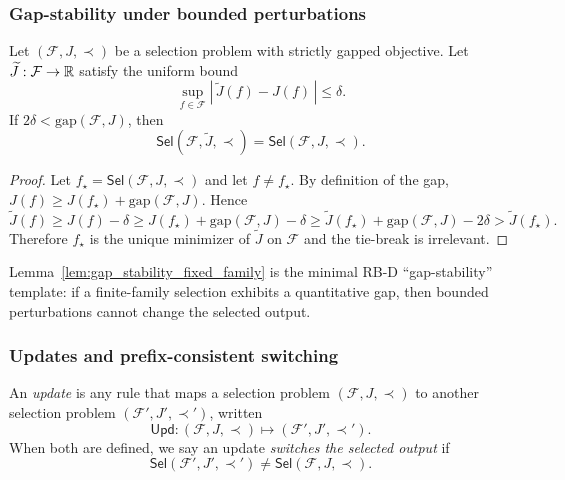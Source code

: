 \subsubsection{Gap-stability under bounded perturbations}
\label{subsec:branching_gap_stability}

\begin{lemma}\label{lem:gap_stability_fixed_family}
Let $(\mathcal{F},J,\prec)$ be a selection problem with strictly gapped objective.
Let $\widetilde J:\mathcal{F}\to\mathbb{R}$ satisfy the uniform bound
\[
\sup_{f\in\mathcal{F}}|\,\widetilde J(f)-J(f)\,|\le \delta.
\]
If $2\delta<\mathrm{gap}(\mathcal{F},J)$, then
\[
\mathsf{Sel}(\mathcal{F},\widetilde J,\prec)=\mathsf{Sel}(\mathcal{F},J,\prec).
\]
\end{lemma}

\begin{proof}
Let $f_\star=\mathsf{Sel}(\mathcal{F},J,\prec)$ and let $f\neq f_\star$.
By definition of the gap, $J(f)\ge J(f_\star)+\mathrm{gap}(\mathcal{F},J)$.
Hence
\[
\widetilde J(f)\ge J(f)-\delta\ge J(f_\star)+\mathrm{gap}(\mathcal{F},J)-\delta
\ge \widetilde J(f_\star)+\mathrm{gap}(\mathcal{F},J)-2\delta>\widetilde J(f_\star).
\]
Therefore $f_\star$ is the unique minimizer of $\widetilde J$ on $\mathcal{F}$ and the tie-break is irrelevant.
\end{proof}

\begin{remark}[RB-D interpretation]\label{rem:rb_d_gap_stability}
Lemma~\ref{lem:gap_stability_fixed_family} is the minimal RB-D ``gap-stability'' template:
if a finite-family selection exhibits a quantitative gap, then bounded perturbations cannot change the selected output.
\end{remark}

\subsubsection{Updates and prefix-consistent switching}
\label{subsec:branching_updates_prefix_consistency}

\begin{definition}\label{def:update_operator_selection_problem}
An \emph{update} is any rule that maps a selection problem $(\mathcal{F},J,\prec)$ to another selection problem
$(\mathcal{F}',J',\prec')$, written
\[
\mathsf{Upd}:(\mathcal{F},J,\prec)\mapsto(\mathcal{F}',J',\prec').
\]
When both are defined, we say an update \emph{switches the selected output} if
\[
\mathsf{Sel}(\mathcal{F}',J',\prec')\neq \mathsf{Sel}(\mathcal{F},J,\prec).
\]
\end{definition}

